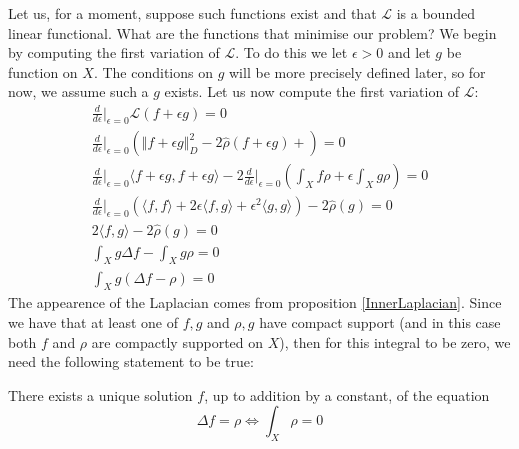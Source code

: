 \documentclass[11pt]{report}
\theoremstyle{definition}
\begin{document}
Let us, for a moment, suppose such functions exist and that $\mathcal{L}$ is a bounded linear functional. What are the functions that minimise our problem?
We begin by computing the first variation of $\mathcal{L}$. To do this we let $\epsilon > 0$ and let $g$ be function on $X$. The conditions on $g$ will be more precisely defined later, so for now, we assume such a $g$ exists. Let us now compute the first variation of $\mathcal{L}$:
\begin{gather*}
  \frac{d}{d\epsilon}\biggr\rvert_{\epsilon = 0}\mathcal{L}(f+\epsilon g) = 0 \\
  \frac{d}{d\epsilon}\biggr\rvert_{\epsilon = 0}(\Vert f+\epsilon g\Vert _D^2 -2\hat{\rho}(f+\epsilon g) +) = 0 \\
  \frac{d}{d\epsilon}\biggr\rvert_{\epsilon = 0} \langle f + \epsilon g, f + \epsilon g \rangle -2\frac{d}{d\epsilon}\biggr\rvert_{\epsilon = 0}(\int_X f\rho  + \epsilon \int_X g\rho) = 0 \\
  \frac{d}{d\epsilon}\biggr\rvert_{\epsilon = 0}(\langle f, f \rangle + 2\epsilon \langle f, g \rangle +\epsilon^2 \langle g, g \rangle) -2 \hat{\rho}(g) = 0 \\
  2\langle f, g \rangle -2\hat{\rho}(g) = 0 \\
  \int_X g\Delta f - \int_X g\rho = 0 \\
  \int_X g(\Delta f - \rho) = 0 
\end{gather*}
The appearence of the Laplacian comes from proposition \ref{InnerLaplacian}.
Since we have that at least one of $f,g$ and $\rho,g$ have compact support (and in this case both $f$ and $\rho$ are compactly supported on $X$), then for this integral to be zero, we need the following statement to be true:

There exists a unique solution $f$, up to addition by a constant, of the equation 
\[ \Delta f = \rho \Longleftrightarrow \int_X \rho = 0\]
\end{document}
